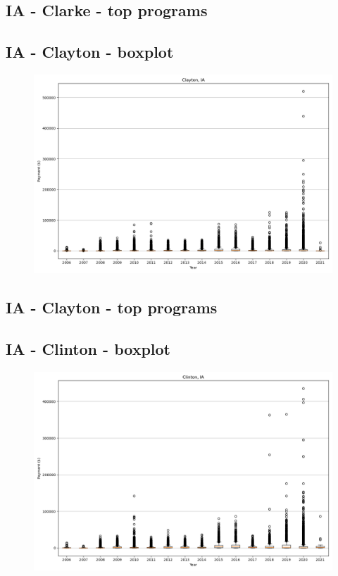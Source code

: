 \subsection*{IA - Clarke - top programs}

\newpage
\subsection*{IA - Clayton - boxplot}
\begin{figure}[h]
\centering
\includegraphics[width=7in]{../output/boxplots/counties/Clayton-IA_boxplot.png}
\end{figure}


\subsection*{IA - Clayton - top programs}

\newpage
\subsection*{IA - Clinton - boxplot}
\begin{figure}[h]
\centering
\includegraphics[width=7in]{../output/boxplots/counties/Clinton-IA_boxplot.png}
\end{figure}


